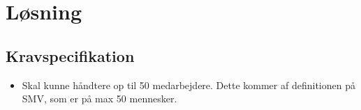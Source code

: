 \chapter{Løsning}\label{ch:losning}

\section{Kravspecifikation}

\begin{itemize}
    \item Skal kunne håndtere op til 50 medarbejdere.
    Dette kommer af definitionen på SMV, som er på max 50 mennesker.
\end{itemize}


